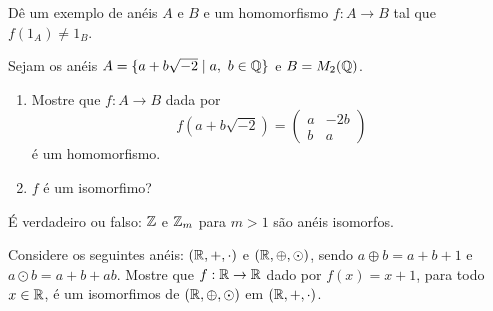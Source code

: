 \documentclass[12pt]{exam}
\begin{document}
\vspace{.3cm}

\questao{} D{\^e} um exemplo de an{\'e}is $A$ e $B$ e um homomorfismo $f : A \to B$ tal que $f(1_A) \ne 1_B$.

\vspace{.3cm}

\questao{} Sejam os an{\'e}is $A = \{ a + b\sqrt{-2} \mid a,\ b \in \mathbb{Q}\}$ e $B = M_2(\mathbb{Q})$.
\begin{enumerate}[label=({\alph*})]
\item Mostre que $f : A \to B$ dada por
\[
f(a + b\sqrt{-2}) =
\begin{pmatrix}
a & -2b\\
b & a
\end{pmatrix}
\]
{\'e} um homomorfismo.
\item $f$ {\'e} um isomorfimo?
\end{enumerate}

\vspace{.3cm}

\questao{} {\'E} verdadeiro ou falso: $\mathbb{Z}$ e $\mathbb{Z}_{m}$ para $m > 1$ s{\~a}o an{\'e}is
isomorfos.

\vspace{.3cm}

\questao{} Considere os seguintes an{\'e}is: $(\mathbb{R}, +, \cdot)$ e $(\mathbb{R}, \oplus, \odot)$, sendo $a \oplus b = a + b + 1$ e $a \odot b = a + b + ab$. Mostre que $f : \mathbb{R} \to \mathbb{R}$ dado por $f(x) = x + 1$, para todo $x \in \mathbb{R}$, {\'e} um isomorfimos de $(\mathbb{R}, \oplus, \odot)$ em $(\mathbb{R}, +, \cdot)$.
\end{document}
